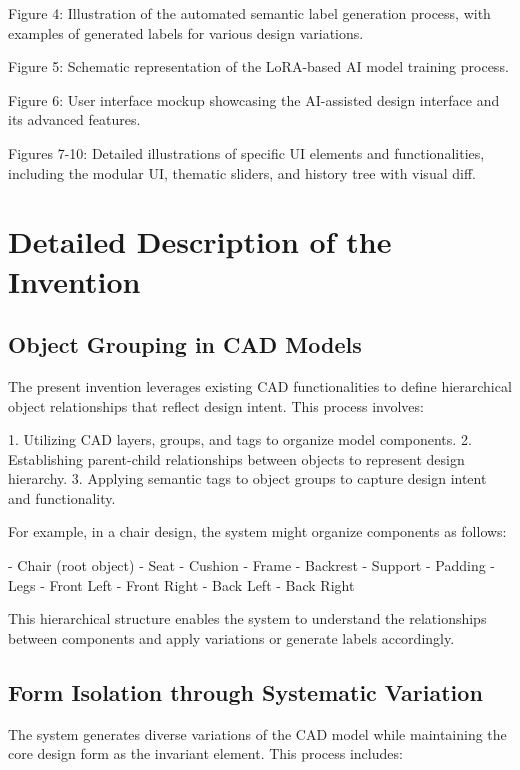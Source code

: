 \documentclass{article}
\begin{document}
Figure 4: Illustration of the automated semantic label generation process, with examples of generated labels for various design variations.

Figure 5: Schematic representation of the LoRA-based AI model training process.

Figure 6: User interface mockup showcasing the AI-assisted design interface and its advanced features.

Figures 7-10: Detailed illustrations of specific UI elements and functionalities, including the modular UI, thematic sliders, and history tree with visual diff.

\section{Detailed Description of the Invention}

\subsection{Object Grouping in CAD Models}

The present invention leverages existing CAD functionalities to define hierarchical object relationships that reflect design intent. This process involves:

1. Utilizing CAD layers, groups, and tags to organize model components.
2. Establishing parent-child relationships between objects to represent design hierarchy.
3. Applying semantic tags to object groups to capture design intent and functionality.

For example, in a chair design, the system might organize components as follows:

- Chair (root object)
  - Seat
    - Cushion
    - Frame
  - Backrest
    - Support
    - Padding
  - Legs
    - Front Left
    - Front Right
    - Back Left
    - Back Right

This hierarchical structure enables the system to understand the relationships between components and apply variations or generate labels accordingly.

\subsection{Form Isolation through Systematic Variation}

The system generates diverse variations of the CAD model while maintaining the core design form as the invariant element. This process includes:
\end{document}
